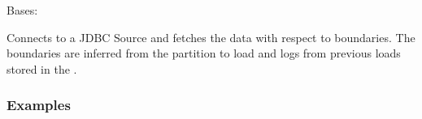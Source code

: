 \documentclass[a4paper,10pt, twoside,english]{sphinxmanual}
\begin{document}
\begin{fulllineitems}
\label{\detokenize{extractor/jdbc:spooq2.extractor.jdbc.JDBCExtractorIncremental}}
Bases: {\hyperref[\detokenize{extractor/jdbc:spooq2.extractor.jdbc.JDBCExtractor}]{}}

Connects to a JDBC Source and fetches the data with respect to boundaries.
The boundaries are inferred from the partition to load and logs from previous loads
stored in the .
\subsubsection*{Examples}


\end{fulllineitems}
\end{document}
